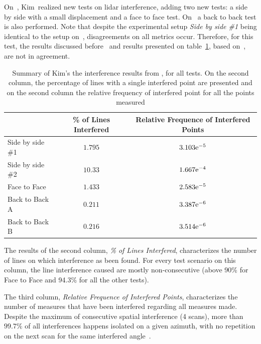 On~\cite{Kim2015b}, Kim~\etal realized new tests on \ac{lidar} interference, adding two new tests: a side by side with a small displacement and a face to face test. On~\cite{Kim2015c} a back to back test is also performed. Note that despite the experimental setup \textit{Side by side \#1} being identical to the setup on~\cite{Kim2015a}, disagreements on all metrics occur. Therefore, for this test, the results discussed before~\cite{Kim2015a} and results presented on table~\ref{tab:kim_2015_results}, based on~\cite{Kim2015b, Kim2015c}, are not in agreement.

\begin{table}[H]
	\centering
	\renewcommand{\arraystretch}{1.3}
		\begin{tabular}{@{}l|c|c@{}}
			                 & \% of Lines Interfered & Relative Frequence of Interfered Points \\ \midrule
			Side by side \#1 & $1.795$                & $3.103\mathrm{e}^{-5}$  \\
			Side by side \#2 & $10.33$                & $1.667\mathrm{e}^{-4}$ \\
			Face to Face     & $1.433$                & $2.583\mathrm{e}^{-5}$  \\
			Back to Back A   & $0.211$                & $3.387\mathrm{e}^{-6}$  \\
			Back to Back B   & $0.216$                & $3.514\mathrm{e}^{-6}$  \\ \bottomrule
		\end{tabular}%
		\caption{Summary of Kim's \etal the interference results from \cite{Kim2015b, Kim2015c}, for all tests. On the second column, the percentage of lines with a single interfered point are presented and on the second column the relative frequency of interfered point for all the points measured}
	\label{tab:kim_2015_results}
\end{table}

The results of the second column, \textit{\% of Lines Interfered}, characterizes the number of lines on which interference as been found. For every test scenario on this column, the line interference caused are mostly non-consecutive (above 90\% for Face to Face and 94.3\% for all the other tests).

The third column, \textit{Relative Frequence of Interfered Points}, characterizes the number of measures that have been interfered regarding all measures made. Despite the maximum of consecutive spatial interference (4 scans), more than $99.7\%$ of all interferences happens isolated on a given azimuth, with no repetition on the next scan for the same interfered angle~\cite{Kim2015c}.



